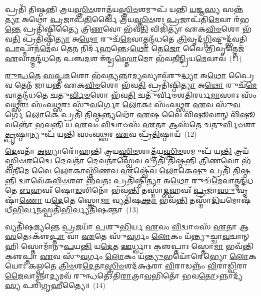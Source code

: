 𑌪𑍍𑌰𑌤𑌿᳴ 𑌤𑌿𑌷𑍍𑌠𑌨𑍍𑌤𑌿 𑌤𑍍𑌰𑌯\-\ul{𑌸𑍍𑌤𑍍𑌰𑌿}\-\-\ul{𑍞}\-𑌶𑌾𑌤𑍍𑌤𑍍𑌰᳴𑌯\-\ul{𑌸𑍍𑌤𑍍𑌰𑌿}\-\-\ul{𑍞}\-𑌶𑌮𑍁𑌪᳴ 𑌯𑌨𑍍𑌤𑌿 \ul{𑌯}\-𑌜𑍍𑌞\-\ul{𑌸𑍍𑌯} 𑌸𑌨𑍍𑌤᳴\-\ul{𑌤𑍍𑌯𑌾} 𑌅𑌥𑍋॑ \ul{𑌪𑍍𑌰}\-𑌜𑌾𑌪᳴\-\ul{𑌤𑌿}\-𑌰𑍍𑌵𑍈 𑌤𑍍𑌰᳴𑌯\-\ul{𑌸𑍍𑌤𑍍𑌰𑌿}\-\-\ul{𑍞}\-𑌶𑌃 \ul{𑌪𑍍𑌰}\-𑌜𑌾𑌪᳴𑌤𑌿\-\ul{𑌮𑍇}\-𑌵𑌾 𑌰᳴𑌭\-\ul{𑌨𑍍𑌤𑍇} 𑌪𑍍𑌰𑌤𑌿᳴𑌷𑍍𑌠𑌿𑌤𑍍𑌯𑍈 𑌤𑍍𑌰𑌿\-\ul{𑌣}\-𑌵𑍋 𑌭᳴𑌵\-\ul{𑌤𑌿} 𑌵𑌿𑌜𑌿᳴𑌤𑍍𑌯𑌾 𑌏𑌕\-\ul{𑌵𑌿}\-\-\ul{𑍞}\-𑌶𑍋 𑌭᳴𑌵\-\ul{𑌤𑌿} 𑌪𑍍𑌰𑌤𑌿᳴𑌷𑍍𑌠𑌿\-\ul{𑌤𑍍𑌯𑌾} 𑌅\-\ul{𑌥𑍋} 𑌰𑍁𑌚᳴\-\ul{𑌮𑍇}\-𑌵𑌾𑌤𑍍𑌮𑌨𑍍𑌦᳴𑌧𑌤𑍇 \ul{𑌤𑍍𑌰𑌿}\-𑌵𑍃𑌦᳴\-\ul{𑌗𑍍𑌨𑌿}\-𑌷𑍍𑌟𑍁𑌦𑍍𑌭᳴𑌵𑌤𑌿 \ul{𑌪𑌾}\-𑌪𑍍𑌮𑌾𑌨᳴\-\ul{𑌮𑍇}\-𑌵 𑌤𑍇\-\ul{𑌨} 𑌨𑌿𑌰𑍍𑌦᳴\-\ul{𑌹}\-𑌨𑍍𑌤𑍇\-𑌽\-\ul{𑌥𑍋} 𑌤𑍇\-\ul{𑌜𑍋} 𑌵𑍈 \ul{𑌤𑍍𑌰𑌿}\-𑌵𑍃𑌤𑍍𑌤𑍇𑌜᳴ \ul{𑌏}\-𑌵𑌾𑌤𑍍𑌮𑌨𑍍𑌦᳴𑌧𑌤𑍇 𑌪𑌞𑍍𑌚\-\ul{𑌦}\-𑌶 𑌇᳴𑌨𑍍𑌦𑍍𑌰\-\ul{𑌸𑍍𑌤𑍋}\-𑌮𑍋 𑌭᳴𑌵𑌤𑍀\-\ul{𑌨𑍍𑌦𑍍𑌰𑌿}\-𑌯\-\ul{𑌮𑍇}\-𑌵𑌾𑌵᳴~(11)

\-\ul{𑌰𑍁}\-\-\ul{𑌨𑍍𑌧}\-\-\ul{𑌤𑍇} \ul{𑌸}\-\-\ul{𑌪𑍍𑌤}\-\-\ul{𑌦}\-𑌶𑍋 𑌭᳴𑌵\-\ul{𑌤𑍍𑌯}\-𑌨𑍍𑌨𑌾\-\ul{𑌦𑍍𑌯}\-𑌸𑍍𑌯𑌾𑌵᳴𑌰𑍁\-\ul{𑌦𑍍𑌧𑍍𑌯𑌾} 𑌅\-\ul{𑌥𑍋} 𑌪𑍍𑌰𑍈𑌵 𑌤𑍇𑌨᳴ 𑌜𑌾𑌯𑌨𑍍𑌤 𑌏𑌕\-\ul{𑌵𑌿}\-\-\ul{𑍞}\-𑌶𑍋 𑌭᳴𑌵\-\ul{𑌤𑌿} 𑌪𑍍𑌰𑌤𑌿᳴𑌷𑍍𑌠𑌿\-\ul{𑌤𑍍𑌯𑌾} 𑌅\-\ul{𑌥𑍋} 𑌰𑍁𑌚᳴\-\ul{𑌮𑍇}\-𑌵𑌾𑌤𑍍𑌮𑌨𑍍𑌦᳴𑌧𑌤𑍇 𑌚𑌤𑍁\-\ul{𑌰𑍍𑌵𑌿}\-\-\ul{𑍞}\-𑌶𑍋 𑌭᳴𑌵\-\ul{𑌤𑌿} 𑌚𑌤𑍁᳴𑌰𑍍𑌵𑌿𑍞𑌶𑌤𑌿𑌰𑌰𑍍𑌧\-\ul{𑌮𑌾}\-𑌸𑌾𑌃 𑌸𑌂᳴𑌵\-\ul{𑌥𑍍𑌸}\-𑌰𑌃 𑌸𑌂᳴𑌵\-\ul{𑌥𑍍𑌸}\-𑌰𑌃 𑌸𑍁᳴\-\ul{𑌵}\-𑌰𑍍𑌗𑍋 \ul{𑌲𑍋}\-𑌕𑌃 𑌸𑌂᳴𑌵\-\ul{𑌥𑍍𑌸}\-𑌰 \ul{𑌏}\-𑌵 𑌸𑍁᳴\-\ul{𑌵}\-𑌰𑍍𑌗𑍇 \ul{𑌲𑍋}\-𑌕𑍇 𑌪𑍍𑌰𑌤𑌿᳴ 𑌤𑌿\-\ul{𑌷𑍍𑌠}\-𑌨𑍍𑌤𑍍𑌯𑌥𑍋᳴ \ul{𑌏}\-𑌷 𑌵𑍈 𑌵𑌿᳴\-\ul{𑌷𑍂}\-𑌵𑌾𑌨𑍍 𑌵𑌿᳴\-\ul{𑌷𑍂}\-𑌵𑌨𑍍𑌤𑍋᳴ 𑌭𑌵\-\ul{𑌨𑍍𑌤𑌿} 𑌯 \ul{𑌏}\-𑌵𑌂 \ul{𑌵𑌿}\-𑌦𑍍𑌵𑌾𑍞𑌸᳴ \ul{𑌏}\-𑌤𑌾 𑌆𑌸᳴𑌤𑍇 𑌚𑌤𑍁\-\ul{𑌰𑍍𑌵𑌿}\-\-\ul{𑍞}\-𑌶𑌾\-\ul{𑌤𑍍𑌪𑍃}\-𑌷𑍍𑌠𑌾𑌨𑍍𑌯𑍁𑌪᳴ 𑌯𑌨𑍍𑌤𑌿 𑌸𑌂𑌵\-\ul{𑌥𑍍𑌸}\-𑌰 \ul{𑌏}\-𑌵 𑌪𑍍𑌰᳴\-\ul{𑌤𑌿}\-𑌷𑍍𑌠𑌾𑌯᳴~(12)

\-\ul{𑌦𑍇}\-𑌵𑌤𑌾᳴ \ul{𑌅}\-𑌭𑍍𑌯𑌾𑌰𑍋᳴𑌹𑌨𑍍𑌤𑌿 𑌤𑍍𑌰𑌯\-\ul{𑌸𑍍𑌤𑍍𑌰𑌿}\-\-\ul{𑍞}\-𑌶𑌾𑌤𑍍𑌤𑍍𑌰᳴𑌯\-\ul{𑌸𑍍𑌤𑍍𑌰𑌿}\-\-\ul{𑍞}\-𑌶𑌮𑍁𑌪᳴ 𑌯\-\ul{𑌨𑍍𑌤𑌿} 𑌤𑍍𑌰𑌯᳴𑌸𑍍𑌤𑍍𑌰𑌿𑍞\-\ul{𑌶}\-𑌦𑍍𑌵𑍈 \ul{𑌦𑍇}\-𑌵𑌤𑌾᳴ \ul{𑌦𑍇}\-𑌵𑌤𑌾॑\-\ul{𑌸𑍍𑌵𑍇}\-𑌵 𑌪𑍍𑌰𑌤𑌿᳴ 𑌤𑌿𑌷𑍍𑌠𑌨𑍍𑌤𑌿 𑌤𑍍𑌰𑌿\-\ul{𑌣}\-𑌵𑍋 𑌭᳴𑌵\-\ul{𑌤𑍀}\-𑌮𑍇 𑌵𑍈 \ul{𑌲𑍋}\-𑌕𑌾𑌸𑍍𑌤𑍍𑌰𑌿᳴\-\ul{𑌣}\-𑌵 \ul{𑌏}\-𑌷𑍍𑌵𑍇᳴𑌵 \ul{𑌲𑍋}\-𑌕𑍇\-\ul{𑌷𑍁} 𑌪𑍍𑌰𑌤𑌿᳴ 𑌤𑌿𑌷𑍍𑌠\-\ul{𑌨𑍍𑌤𑌿} 𑌦𑍍𑌵𑌾𑌵𑍇᳴𑌕\-\ul{𑌵𑌿}\-\-\ul{𑍞}\-𑌶𑍗 𑌭᳴𑌵\-\ul{𑌤𑌃} 𑌪𑍍𑌰𑌤𑌿᳴𑌷𑍍𑌠𑌿\-\ul{𑌤𑍍𑌯𑌾} 𑌅\-\ul{𑌥𑍋} 𑌰𑍁𑌚᳴\-\ul{𑌮𑍇}\-𑌵𑌾𑌤𑍍𑌮𑌨𑍍𑌦᳴𑌧𑌤𑍇 \ul{𑌬}\-𑌹𑌵𑌃᳴ 𑌷𑍋\-\ul{𑌡}\-𑌶𑌿𑌨𑍋᳴ 𑌭𑌵\-\ul{𑌨𑍍𑌤𑌿} 𑌤𑌸𑍍𑌮𑌾॑\-\ul{𑌦𑍍𑌬}\-𑌹𑌵𑌃᳴ \ul{𑌪𑍍𑌰}\-𑌜𑌾\-\ul{𑌸𑍁} 𑌵𑍃𑌷𑌾᳴\-\ul{𑌣𑍋} 𑌯\-\ul{𑌦𑍇}\-𑌤𑍇 𑌸𑍍𑌤𑍋\-\ul{𑌮𑌾} 𑌵𑍍𑌯𑌤𑌿᳴𑌷\-\ul{𑌕𑍍𑌤𑌾} 𑌭𑌵᳴\-\ul{𑌨𑍍𑌤𑌿} 𑌤𑌸𑍍𑌮𑌾᳴\-\ul{𑌦𑌿}\-𑌯𑌮𑍋𑌷᳴𑌧𑍀\-\ul{𑌭𑌿}\-𑌰𑍍𑌵\-\ul{𑌨}\-𑌸𑍍𑌪𑌤𑌿᳴\-\ul{𑌭𑌿}\-𑌰𑍍𑌵𑍍𑌯𑌤𑌿᳴𑌷𑌕𑍍𑌤𑌾~(13)

𑌵𑍍𑌯𑌤𑌿᳴𑌷𑌜𑍍𑌯𑌨𑍍𑌤𑍇 \ul{𑌪𑍍𑌰}\-𑌜𑌯𑌾᳴ \ul{𑌪}\-𑌶𑍁\-\ul{𑌭𑌿}\-𑌰𑍍𑌯 \ul{𑌏}\-𑌵𑌂 \ul{𑌵𑌿}\-𑌦𑍍𑌵𑌾𑍞𑌸᳴ \ul{𑌏}\-𑌤𑌾 𑌆\-\ul{𑌸}\-𑌤𑍇\-𑌽𑌕𑍢᳴\-\ul{𑌪𑍍𑌤𑌾} 𑌵𑌾 \ul{𑌏}\-𑌤𑍇 𑌸𑍁᳴\-\ul{𑌵}\-𑌰𑍍𑌗𑌂 \ul{𑌲𑍋}\-𑌕𑌂 𑌯᳴𑌨𑍍𑌤𑍍𑌯𑍁𑌚𑍍𑌚𑌾\-\ul{𑌵}\-𑌚𑌾𑌨𑍍 𑌹𑌿 𑌸𑍍𑌤𑍋𑌮𑌾᳴𑌨𑍁\-\ul{𑌪}\-𑌯\-\ul{𑌨𑍍𑌤𑌿} 𑌯\-\ul{𑌦𑍇}\-𑌤 \ul{𑌊}\-𑌰𑍍𑌧𑍍𑌵𑌾𑌃 𑌕𑍢॒𑌪𑍍𑌤𑌾𑌃 𑌸𑍍𑌤𑍋\-\ul{𑌮𑌾} 𑌭𑌵᳴𑌨𑍍𑌤𑌿 𑌕𑍢॒𑌪𑍍𑌤𑌾 \ul{𑌏}\-𑌵 𑌸𑍁᳴\-\ul{𑌵}\-𑌰𑍍𑌗𑌂 \ul{𑌲𑍋}\-𑌕𑌂 𑌯᳴\-\ul{𑌨𑍍𑌤𑍍𑌯𑍁}\-𑌭𑌯𑍋᳴𑌰𑍇𑌭𑍍𑌯𑍋 \ul{𑌲𑍋}\-𑌕𑌯𑍋𑌃॑ 𑌕𑌲𑍍𑌪𑌤𑍇 \ul{𑌤𑍍𑌰𑌿}\-\-\ul{𑍞}\-𑌶\-\ul{𑌦𑍇}\-𑌤𑌾\-\ul{𑌸𑍍𑌤𑍍𑌰𑌿}\-\-\ul{𑍞}\-𑌶𑌦᳴𑌕𑍍𑌷𑌰𑌾 \ul{𑌵𑌿}\-𑌰𑌾𑌡𑌨𑍍𑌨𑌂᳴ \ul{𑌵𑌿}\-𑌰𑌾\-\ul{𑌡𑍍𑌵𑌿}\-𑌰𑌾\-\ul{𑌜𑍈}\-𑌵𑌾𑌨𑍍𑌨𑌾\-\ul{𑌦𑍍𑌯}\-𑌮𑌵᳴ 𑌰𑍁𑌨𑍍𑌧𑌤𑍇\-𑌽𑌤𑌿\-\ul{𑌰𑌾}\-𑌤𑍍𑌰𑌾\-\ul{𑌵}\-𑌭𑌿𑌤𑍋᳴ 𑌭𑌵\-\ul{𑌤𑍋}\-\-𑌽𑌨𑍍𑌨𑌾𑌦𑍍𑌯᳴\-\ul{𑌸𑍍𑌯} 𑌪𑌰𑌿᳴𑌗𑍃𑌹𑍀𑌤𑍍𑌯𑍈॥~(14)

